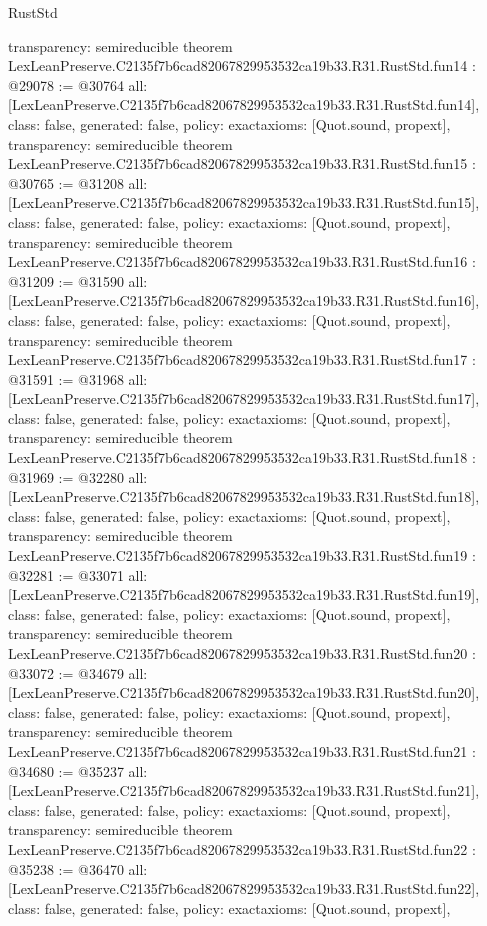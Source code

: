 \begin{lexlean}{RustStd}
\begin{coremodule}
{  transparency: semireducible
}
theorem LexLeanPreserve.C2135f7b6cad82067829953532ca19b33.R31.RustStd.fun14 : @29078 := @30764 {
  all: [LexLeanPreserve.C2135f7b6cad82067829953532ca19b33.R31.RustStd.fun14],
  class: false,
  generated: false,
  policy: exact{axioms: [Quot.sound, propext]},
  transparency: semireducible
}
theorem LexLeanPreserve.C2135f7b6cad82067829953532ca19b33.R31.RustStd.fun15 : @30765 := @31208 {
  all: [LexLeanPreserve.C2135f7b6cad82067829953532ca19b33.R31.RustStd.fun15],
  class: false,
  generated: false,
  policy: exact{axioms: [Quot.sound, propext]},
  transparency: semireducible
}
theorem LexLeanPreserve.C2135f7b6cad82067829953532ca19b33.R31.RustStd.fun16 : @31209 := @31590 {
  all: [LexLeanPreserve.C2135f7b6cad82067829953532ca19b33.R31.RustStd.fun16],
  class: false,
  generated: false,
  policy: exact{axioms: [Quot.sound, propext]},
  transparency: semireducible
}
theorem LexLeanPreserve.C2135f7b6cad82067829953532ca19b33.R31.RustStd.fun17 : @31591 := @31968 {
  all: [LexLeanPreserve.C2135f7b6cad82067829953532ca19b33.R31.RustStd.fun17],
  class: false,
  generated: false,
  policy: exact{axioms: [Quot.sound, propext]},
  transparency: semireducible
}
theorem LexLeanPreserve.C2135f7b6cad82067829953532ca19b33.R31.RustStd.fun18 : @31969 := @32280 {
  all: [LexLeanPreserve.C2135f7b6cad82067829953532ca19b33.R31.RustStd.fun18],
  class: false,
  generated: false,
  policy: exact{axioms: [Quot.sound, propext]},
  transparency: semireducible
}
theorem LexLeanPreserve.C2135f7b6cad82067829953532ca19b33.R31.RustStd.fun19 : @32281 := @33071 {
  all: [LexLeanPreserve.C2135f7b6cad82067829953532ca19b33.R31.RustStd.fun19],
  class: false,
  generated: false,
  policy: exact{axioms: [Quot.sound, propext]},
  transparency: semireducible
}
theorem LexLeanPreserve.C2135f7b6cad82067829953532ca19b33.R31.RustStd.fun20 : @33072 := @34679 {
  all: [LexLeanPreserve.C2135f7b6cad82067829953532ca19b33.R31.RustStd.fun20],
  class: false,
  generated: false,
  policy: exact{axioms: [Quot.sound, propext]},
  transparency: semireducible
}
theorem LexLeanPreserve.C2135f7b6cad82067829953532ca19b33.R31.RustStd.fun21 : @34680 := @35237 {
  all: [LexLeanPreserve.C2135f7b6cad82067829953532ca19b33.R31.RustStd.fun21],
  class: false,
  generated: false,
  policy: exact{axioms: [Quot.sound, propext]},
  transparency: semireducible
}
theorem LexLeanPreserve.C2135f7b6cad82067829953532ca19b33.R31.RustStd.fun22 : @35238 := @36470 {
  all: [LexLeanPreserve.C2135f7b6cad82067829953532ca19b33.R31.RustStd.fun22],
  class: false,
  generated: false,
  policy: exact{axioms: [Quot.sound, propext]},
}
\end{coremodule}
\end{lexlean}
